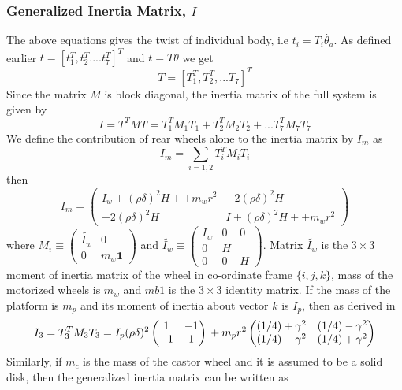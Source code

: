 \subsubsection{Generalized Inertia Matrix, $I$}
 The above equations gives the twist of individual body, i.e $t_i=T_i\dot{\theta_a}$. As defined earlier  $t=[t_1^T, t_2^T....t_7^T]^T$ and $t=T\theta$ we get  \[T=[T_1^T, T_2^T,... T_7]^T\] Since the matrix $M$ is block diagonal, the inertia matrix of the full system is given by
\begin{equation}
I=T^TMT=T_1^TM_1T_1+T_2^TM_2T_2+...T_7^TM_7T_7
\end{equation}
We define the contribution of rear wheels alone to the inertia matrix by $I_m$ as  \[ I_m=\sum_{i=1,2}T_i^TM_iT_i\] then
\begin{equation}
\label{eqn:I_wheel}
I_m=\begin{pmatrix}
I_w+(\rho\delta)^2H++m_wr^2 & -2(\rho\delta)^2H
\\
-2(\rho\delta)^2H &I+(\rho\delta)^2H++m_wr^2
\end{pmatrix} 
\end{equation}
where $ M_i \equiv\begin{pmatrix}
\tilde{I_w} &0\\0 & m_w\mathbf{1}
\end{pmatrix} $ and $\tilde{I_w}\equiv\begin{pmatrix}
I_w&0&0\\0&H&\\0&0&H
\end{pmatrix}$. Matrix $\tilde{I_w}$ is the $3\times 3$ moment of inertia matrix of the wheel in co-ordinate frame $\{i,j,k\}$, mass of the motorized wheels is  $m_w$ and $mb{1}$ is the $3\times 3$ identity matrix.
If the mass of the platform is $m_p$ and its moment of inertia about vector ${k}$ is $I_p$, then as derived in \cite{angeles2013fundamentals} 
\begin{equation}
\label{eqn:I_platform}
I_3=T^T_3M_3T_3 =I_p(\rho\delta)^2\begin{pmatrix}
1&-1\\-1&1 \end{pmatrix}\\
+m_pr^2\begin{pmatrix}
(1/4)+\gamma^2 & (1/4)-\gamma^2\\(1/4)-\gamma^2 & (1/4)+\gamma^2
\end{pmatrix}
\end{equation}
Similarly, if $m_c$ is the mass of the castor wheel and it is assumed to be a solid disk, then the generalized inertia matrix  can be written as
